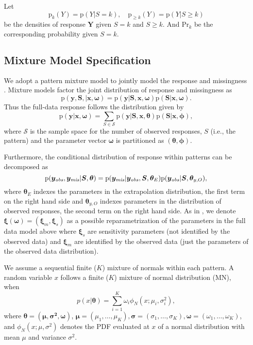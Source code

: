 \documentclass[12pt]{article}
\newcommand{\pr}{\mbox{p}}
\newcommand{\prob}{\mbox{Pr}}
\newcommand{\ymis}{\bm y_{\it{mis}}}
\begin{document}
Let
\begin{displaymath}
  \pr_k(Y) = \pr (Y | S = k), \quad  \pr_{\geq k} (Y)  = \pr (Y | S \geq k)
\end{displaymath}
be the densities of response $\bm Y$ given $S=k$ and $S
\geq k$. And $\prob_k$ be the corresponding probability given $S = k$.

\subsection{Mixture Model Specification}
\label{ch3:sec:settings}
We adopt a pattern mixture model to jointly model the response and missingness \citep{little1994, dh2008}.
Mixture models factor the joint distribution of response and missingness as
\begin{displaymath}
  \pr (\bm y, \bm S, |\bm x, \bm \omega) = \pr (\bm y|\bm S, \bm x, \bm \omega) \pr (\bm S | \bm x, \bm \omega).
\end{displaymath}
Thus the full-data response follows the distribution given by
\begin{displaymath}
  \pr (\bm y | \bm x, \bm \omega) = \sum_{S \in \mathcal{S}} \pr(\bm y| \bm S, \bm x, \bm \theta) \pr (\bm S | \bm x, \bm \phi),
\end{displaymath}
where $\mathcal{S}$ is the sample space for the number of observed responses, $S$ (i.e., the pattern) and the parameter vector $\bm \omega$ is partitioned as $(\bm \theta, \bm \phi)$.

Furthermore, the conditional distribution of response within patterns can be decomposed as
\begin{equation}\label{eq:decompose}
  \pr (\yobs, \ymis | \bm S, \bm \theta) = \pr
  (\ymis|\yobs, \bm S, \bm \theta_E) \pr (\yobs | \bm S, \bm
  \theta_{y, O}),
\end{equation}
where $\bm \theta_E$ indexes the parameters in the extrapolation distribution,
the first term on the right hand side and $\bm \theta_{y, O}$ indexes parameters in the distribution of observed responses, the second term on the right hand side.
As in \cite{dh2008}, we denote $\bm \xi(\bm \omega) = (\bm \xi_m, \bm \xi_s)$ as a possible reparametrization of the parameters in the full data model above where $\bm \xi_s$ are sensitivity parameters (not identified by the observed data) and $\bm \xi_m$ are identified by the observed data (just the parameters of the observed data distribution).

We assume a sequential finite ($K$) mixture of normals within each pattern.
A random variable $x$ follows a finite ($K$) mixture of normal distribution (MN), when
\begin{displaymath}
p(x|\bm \theta) = \sum_{i = 1}^K \omega_i \phi_N(x; \mu_i, \sigma_i^2),
\end{displaymath}
where $\bm \theta = (\bm{\mu, \sigma^2, \omega})$, $\bm \mu = (\mu_1, \ldots, \mu_K), \bm \sigma = (\sigma_1, \ldots, \sigma_K), \bm \omega = (\omega_1, \ldots, \omega_K)$,
and $\phi_N(x; \mu, \sigma^2)$ denotes the PDF evaluated at $x$ of a normal distribution with mean $\mu$ and variance $\sigma^2$.
\end{document}
